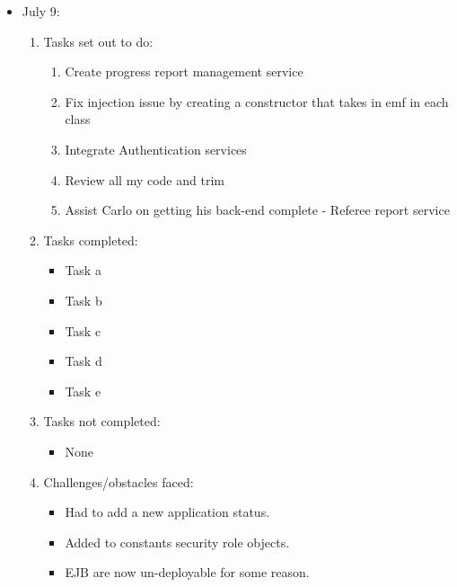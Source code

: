 	\begin{itemize}
		\item July 9:
		\begin{enumerate}
			\item Tasks set out to do:
			\begin{enumerate}
				\item Create progress report management service
				\item Fix injection issue by creating a constructor that takes in emf in each class
				\item Integrate Authentication services
				\item Review all my code and trim
				\item Assist Carlo on getting his back-end complete - Referee report service			
			\end{enumerate}
			\item Tasks completed:
			\begin{itemize}
				\item Task a
				\item Task b
				\item Task c
				\item Task d
				\item Task e
			\end{itemize}
			\item Tasks not completed:
			\begin{itemize}
				\item None
			\end{itemize}
			\item Challenges/obstacles faced:
			\begin{itemize}
				\item Had to add a new application status.
				\item Added to constants security role objects.
				\item EJB are now un-deployable for some reason.		
			\end{itemize}			
		\end{enumerate}
	\end{itemize}
	
